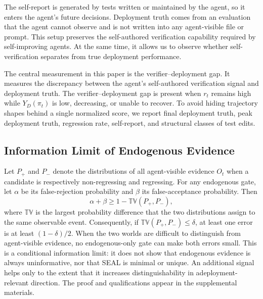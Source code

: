\documentclass[letterpaper]{article} \usepackage{aaai2027}  \usepackage[hyphens]{url}  \usepackage{graphicx} \urlstyle{rm} \def\UrlFont{\rm}  \usepackage{natbib}  \usepackage{caption} \usepackage{amsfonts} \usepackage{multirow} \frenchspacing  \usepackage{algorithm}
\begin{document}
The self-report is generated by tests written or maintained by the agent, so it enters the agent's future decisions.
Deployment truth comes from an evaluation that the agent cannot observe and is not written into any agent-visible file or prompt.
This setup preserves the self-authored verification capability required by self-improving agents. At the same time, it allows us to observe whether self-verification separates from true deployment performance.

The central measurement in this paper is the verifier--deployment gap. It measures the discrepancy between the agent’s self-authored verification signal and deployment truth. 
The verifier--deployment gap is present when $r_t$ remains high while $Y_D(\pi_t)$ is low, decreasing, or unable to recover. 
To avoid hiding trajectory shapes behind a single normalized score, we report final deployment truth, peak deployment truth, regression rate, self-report, and structural classes of test edits.






\subsection{Information Limit of Endogenous Evidence}
Let $P_+$ and $P_-$ denote the distributions of all agent-visible evidence $O_t$ when a candidate is respectively non-regressing and regressing. For any endogenous gate, let $\alpha$ be its false-rejection probability and $\beta$ its false-acceptance probability. Then
\begin{equation}
    \alpha+\beta\geq 1-\mathbb{TV}(P_+,P_-),
\end{equation}
where $\mathbb{TV}$ is the largest probability difference that the two distributions assign to the same observable event. 
Consequently, if $\mathbb{TV}(P_+,P_-)\leq\delta$, at least one error is at least $(1-\delta)/2$. When the two worlds are difficult to distinguish from agent-visible evidence, no endogenous-only gate can make both errors small.
This is a conditional information limit: it does not show that endogenous evidence is always uninformative, nor that SEAL is minimal or unique. An additional signal helps only to the extent that it increases distinguishability in adeployment-relevant direction.
The proof and qualifications appear in the supplemental materials.
\end{document}
